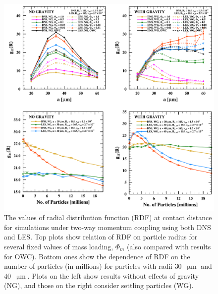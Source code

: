 \documentclass{pracamgren}
\begin{document}
\begin{figure}[ht]
\centering
\includegraphics[width=13.5cm]{figures/2-08_twcrdf.pdf}
\caption{
The values of radial distribution function (RDF) at contact distance for simulations under two-way momentum coupling using both DNS and LES.
Top plots show relation of RDF on particle radius for several fixed values of mass loading, $\Phi_m$ (also compared with results for OWC).
Bottom ones show the dependence of RDF on the number of particles (in millions) for particles with radii $30$~$\upmu\text{m}$ and $40$~$\upmu\text{m}$.
Plots on the left show results without effects of gravity (NG), and those on the right consider settling particles (WG).
}
\label{fig:twcrdf}
\end{figure}
\end{document}
